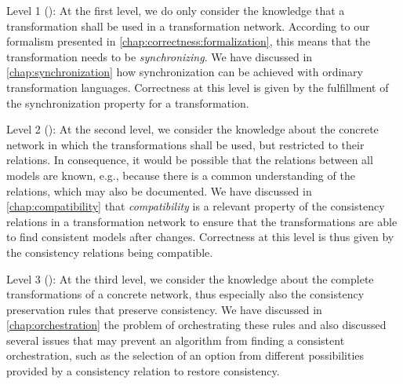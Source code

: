 \begin{properdescription}
\item[Level 1 (\emph{\LevelTransformation}):] 
At the first level, we do only consider the knowledge that a transformation shall be used in a transformation network.
According to our formalism presented in \autoref{chap:correctness:formalization}, this means that the transformation needs to be \emph{synchronizing}.
We have discussed in \autoref{chap:synchronization} how synchronization can be achieved with ordinary transformation languages.
Correctness at this level is given by the fulfillment of the synchronization property for a transformation.

\item[Level 2 (\emph{\LevelNetworkRelation}):] 
At the second level, we consider the knowledge about the concrete network in which the transformations shall be used, but restricted to their relations.
In consequence, it would be possible that the relations between all models are known, e.g., because there is a common understanding of the relations, which may also be documented.
We have discussed in \autoref{chap:compatibility} that \emph{compatibility} is a relevant property of the consistency relations in a transformation network to ensure that the transformations are able to find consistent models after changes.
Correctness at this level is thus given by the consistency relations being compatible.

\item[Level 3 (\emph{\LevelNetworkRule}):] 
At the third level, we consider the knowledge about the complete transformations of a concrete network, thus especially also the consistency preservation rules that preserve consistency.
We have discussed in \autoref{chap:orchestration} the problem of orchestrating these rules and also discussed several issues that may prevent an algorithm from finding a consistent orchestration, such as the selection of an option from different possibilities provided by a consistency relation to restore consistency.

\end{properdescription}



